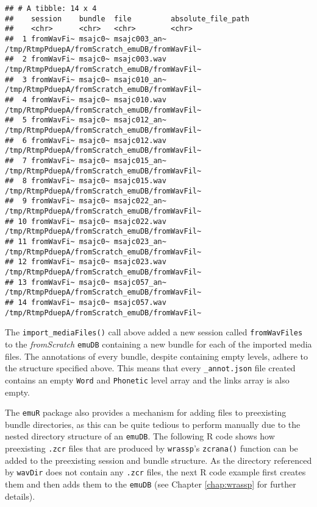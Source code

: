 \documentclass[
]{book}
\begin{document}
\begin{verbatim}
## # A tibble: 14 x 4
##    session    bundle  file         absolute_file_path                           
##    <chr>      <chr>   <chr>        <chr>                                        
##  1 fromWavFi~ msajc0~ msajc003_an~ /tmp/RtmpPduepA/fromScratch_emuDB/fromWavFil~
##  2 fromWavFi~ msajc0~ msajc003.wav /tmp/RtmpPduepA/fromScratch_emuDB/fromWavFil~
##  3 fromWavFi~ msajc0~ msajc010_an~ /tmp/RtmpPduepA/fromScratch_emuDB/fromWavFil~
##  4 fromWavFi~ msajc0~ msajc010.wav /tmp/RtmpPduepA/fromScratch_emuDB/fromWavFil~
##  5 fromWavFi~ msajc0~ msajc012_an~ /tmp/RtmpPduepA/fromScratch_emuDB/fromWavFil~
##  6 fromWavFi~ msajc0~ msajc012.wav /tmp/RtmpPduepA/fromScratch_emuDB/fromWavFil~
##  7 fromWavFi~ msajc0~ msajc015_an~ /tmp/RtmpPduepA/fromScratch_emuDB/fromWavFil~
##  8 fromWavFi~ msajc0~ msajc015.wav /tmp/RtmpPduepA/fromScratch_emuDB/fromWavFil~
##  9 fromWavFi~ msajc0~ msajc022_an~ /tmp/RtmpPduepA/fromScratch_emuDB/fromWavFil~
## 10 fromWavFi~ msajc0~ msajc022.wav /tmp/RtmpPduepA/fromScratch_emuDB/fromWavFil~
## 11 fromWavFi~ msajc0~ msajc023_an~ /tmp/RtmpPduepA/fromScratch_emuDB/fromWavFil~
## 12 fromWavFi~ msajc0~ msajc023.wav /tmp/RtmpPduepA/fromScratch_emuDB/fromWavFil~
## 13 fromWavFi~ msajc0~ msajc057_an~ /tmp/RtmpPduepA/fromScratch_emuDB/fromWavFil~
## 14 fromWavFi~ msajc0~ msajc057.wav /tmp/RtmpPduepA/fromScratch_emuDB/fromWavFil~
\end{verbatim}

The \texttt{import\_mediaFiles()} call above added a new session called \texttt{fromWavFiles} to the \emph{fromScratch} \texttt{emuDB} containing a new bundle for each of the imported media files. The annotations of every bundle, despite containing empty levels, adhere to the structure specified above. This means that every \texttt{\_annot.json} file created contains an empty \texttt{Word} and \texttt{Phonetic} level array and the links array is also empty.

The \texttt{emuR} package also provides a mechanism for adding files to preexisting bundle directories, as this can be quite tedious to perform manually due to the nested directory structure of an \texttt{emuDB}. The following R code shows how preexisting \texttt{.zcr} files that are produced by \texttt{wrassp}'s \texttt{zcrana()} function can be added to the preexisting session and bundle structure. As the directory referenced by \texttt{wavDir} does not contain any \texttt{.zcr} files, the next R code example first creates them and then adds them to the \texttt{emuDB} (see Chapter \ref{chap:wrassp} for further details).
\end{document}
